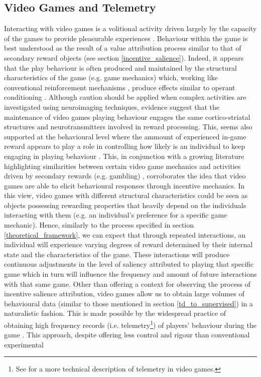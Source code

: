 \subsection{Video Games and Telemetry}
\label{videogame_telemetries}
Interacting with video games is a volitional activity driven largely by the capacity of the games to provide pleasurable experiences \cite{boyle2012engagement}. Behaviour within the game is best understood as the result of a value attribution process similar to that of secondary reward objects (see section \ref{incentive_salience}). Indeed, it appears that the play behaviour is often produced and maintained by the structural characteristics of the game (e.g. game mechanics) \cite{king2010video} which, working like conventional reinforcement mechanisms \cite{chumbley2006affect,wang2011game,phillips2013videogame,avserivskis2017computational}, produce effects similar to operant conditioning \cite{skinner1965science}. Although caution should be applied when complex activities are investigated using neuroimaging techniques, evidence suggest that the maintenance of video games playing behaviour engages the same cortico-striatal structures \cite{hoeft2008gender,mathiak2011reward,cole2012interactivity,klasen2012neural,lorenz2015video,gleich2017functional} and neurotransmitters \cite{koepp1998evidence} involved in reward processing. This, seems also supported at the behavioural level where the ammount of experienced in-game reward appears to play a role in controlling how likely is an individual to keep engaging in playing behaviour \cite{agarwal2017quitting, steyvers2019joint}. This, in conjunction with a growing literature highlighting similarities between certain video game mechanics and activities driven by secondary rewards (e.g. gambling) \cite{king2010role,drummond2018video,zendle2018video}, corroborates the idea that video games are able to elicit behavioural responses through incentive mechanics. In this view, video games with different structural characteristics could be seen as objects possessing rewarding properties that heavily depend on the individuals interacting with them (e.g. an individual's preference for a specific game mechanic). Hence, similarly to the process specified in section \ref{theoretical_framework}, we can expect that through repeated interactions, an individual will experience varying degrees of reward determined by their internal state and the characteristics of the game. These interactions will produce continuous adjustments in the level of saliency attributed to playing that specific game which in turn will influence the frequency and amount of future interactions with that same game. Other than offering a context for observing the process of incentive salience attribution, video games allow us to obtain large volumes of behavioural data (similar to those mentioned in section \ref{td_to_supervised}) in a naturalistic fashion. This is made possible by the widespread practice of obtaining high frequency records (i.e. telemetry\footnote{See \cite{el2016game} for a more technical description of telemetry in video games.}) of players' behaviour during the game \cite{drachen2015behavioral}. This approach, despite offering less control and rigour than conventional experimental 